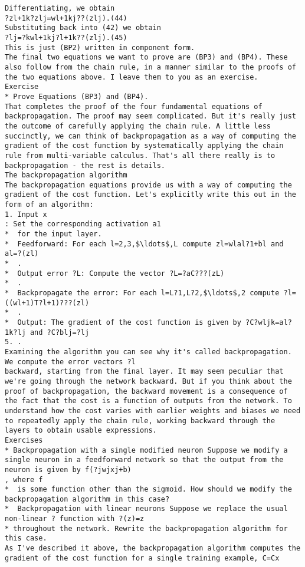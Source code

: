 \begin{lstlisting}
Differentiating, we obtain 
?zl+1k?zlj=wl+1kj??(zlj).(44)
Substituting back into (42) we obtain 
?lj=?kwl+1kj?l+1k??(zlj).(45)
This is just (BP2) written in component form.
The final two equations we want to prove are (BP3) and (BP4). These also follow from the chain rule, in a manner similar to the proofs of the two equations above. I leave them to you as an exercise. 
Exercise
* Prove Equations (BP3) and (BP4). 
That completes the proof of the four fundamental equations of backpropagation. The proof may seem complicated. But it's really just the outcome of carefully applying the chain rule. A little less succinctly, we can think of backpropagation as a way of computing the gradient of the cost function by systematically applying the chain rule from multi-variable calculus. That's all there really is to backpropagation - the rest is details.
The backpropagation algorithm
The backpropagation equations provide us with a way of computing the gradient of the cost function. Let's explicitly write this out in the form of an algorithm: 
1. Input x
: Set the corresponding activation a1
*  for the input layer. 
*  Feedforward: For each l=2,3,$\ldots$,L compute zl=wlal?1+bl and al=?(zl)
*  .
*  Output error ?L: Compute the vector ?L=?aC???(zL)
*  .
*  Backpropagate the error: For each l=L?1,L?2,$\ldots$,2 compute ?l=((wl+1)T?l+1)???(zl)
*  .
*  Output: The gradient of the cost function is given by ?C?wljk=al?1k?lj and ?C?blj=?lj
5. . 
Examining the algorithm you can see why it's called backpropagation. We compute the error vectors ?l
backward, starting from the final layer. It may seem peculiar that we're going through the network backward. But if you think about the proof of backpropagation, the backward movement is a consequence of the fact that the cost is a function of outputs from the network. To understand how the cost varies with earlier weights and biases we need to repeatedly apply the chain rule, working backward through the layers to obtain usable expressions.
Exercises
* Backpropagation with a single modified neuron Suppose we modify a single neuron in a feedforward network so that the output from the neuron is given by f(?jwjxj+b)
, where f
*  is some function other than the sigmoid. How should we modify the backpropagation algorithm in this case?
*  Backpropagation with linear neurons Suppose we replace the usual non-linear ? function with ?(z)=z
* throughout the network. Rewrite the backpropagation algorithm for this case. 
As I've described it above, the backpropagation algorithm computes the gradient of the cost function for a single training example, C=Cx

\end{lstlisting}
